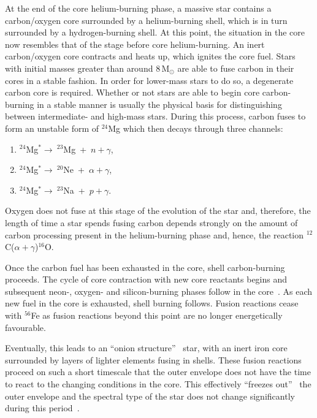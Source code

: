 At the end of the core helium-burning phase, a massive star contains a carbon/oxygen core surrounded by a helium-burning shell, which is in turn surrounded by a hydrogen-burning shell.
At this point, the situation in the core now resembles that of the stage before core helium-burning.
An inert carbon/oxygen core contracts and heats up, which ignites the core fuel.
Stars with initial masses greater than around 8\,M$_{\odot}$ are able to fuse carbon in their cores in a stable fashion.
In order for lower-mass stars to do so, a degenerate carbon core is required.
Whether or not stars are able to begin core carbon-burning in a stable manner is usually the physical basis for distinguishing between intermediate- and high-mass stars.
During this process, carbon fuses to form an unstable form of $^{24}$Mg which then decays through three channels:

\begin{enumerate}
    \item $^{24}$Mg$^{*}\rightarrow~^{23}$Mg~+~$n+\gamma$,
    \item $^{24}$Mg$^{*}\rightarrow~^{20}$Ne~+~$\alpha+\gamma$,
    \item $^{24}$Mg$^{*}\rightarrow~^{23}$Na~+~$p+\gamma$.
\end{enumerate}

Oxygen does not fuse at this stage of the evolution of the star and, therefore, the length of time a star spends fusing carbon depends strongly on the amount of carbon processing present in the helium-burning phase and, hence, the reaction $^{12}$C($\alpha+\gamma$)$^{16}$O.

Once the carbon fuel has been exhausted in the core, shell carbon-burning proceeds.
The cycle of core contraction with new core reactants begins and subsequent neon-, oxygen- and silicon-burning phases follow in the core~\citep{Woosley02}.
As each new fuel in the core is exhausted, shell burning follows.
Fusion reactions cease with $^{56}$Fe as fusion reactions beyond this point are no longer energetically favourable.

Eventually, this leads to an ``onion structure''
~star, with an inert iron core surrounded by layers of lighter elements fusing in shells.
These fusion reactions proceed on such a short timescale that the outer envelope does not have the time to react to the changing conditions in the core.
This effectively ``freezes out'' ~the outer envelope and the spectral type of the star does not change significantly during this period~\citep{Meynet11}.

